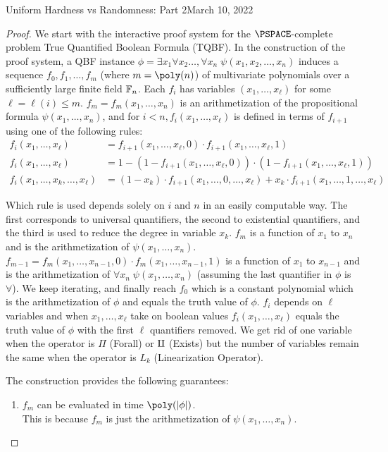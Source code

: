 \begin{lecture}{8}{Uniform Hardness vs Randomness: Part 2}{March 10, 2022}
\begin{proof}
We start with the interactive proof system for the $\PSPACE$-complete problem True Quantified Boolean Formula (TQBF). In the construction of the proof system, a QBF instance 
$\phi = \exists x_1 \forall x_2 \ldots , \forall x_n \; \psi(x_1,x_2, \ldots, x_n)$ induces a sequence $f_0, f_1, \ldots , f_m$ (where $m = \poly(n)$) of multivariate polynomials over a sufficiently large finite field $\mathbb{F}_n$. 
Each $f_i$ has variables $(x_1, \dots, x_{\ell})$ for some $\ell = \ell(i) \leq m$. 
$f_m = f_m(x_1, \ldots , x_n)$ is an arithmetization of the propositional formula $\psi(x_1, \ldots , x_n)$, and for $i < n, f_i( x_1, \ldots , x_{\ell})$ is defined in terms of $f_{i+1}$ using one of the following rules:
\begin{align*}
	f_i(x_1, \ldots, x_{\ell}) &= f_{i+1}(x_1, \ldots, x_{\ell},0) \cdot f_{i+1}(x_1, \ldots, x_{\ell},1) \tag{Forall} \\
	f_i(x_1, \ldots, x_{\ell}) &= 1- ( 1- f_{i+1}(x_1, \ldots, x_{\ell},0) ) \cdot ( 1- f_{i+1}(x_1, \ldots, x_{\ell},1) ) \tag{Exists}	\\
	f_i(x_1, \ldots, x_k, \ldots, x_{\ell}) &= (1-x_k) \cdot f_{i+1}(x_1, \ldots, 0, \ldots, x_{\ell}) + x_k \cdot f_{i+1}(x_1, \ldots, 1, \ldots, x_{\ell}) \tag{Linearization}
\end{align*}

Which rule is used depends solely on $i$ and $n$ in an easily computable way. The first corresponds to universal quantifiers, the second to existential quantifiers, and the third is used to reduce the degree in variable $x_k$.
$f_m$ is a function of $x_1$ to $x_n$ and is the arithmetization of $\psi(x_1, \ldots , x_n)$. $f_{m-1}=f_{m}(x_1, \ldots, x_{n-1},0) \cdot f_{m}(x_1, \ldots, x_{n-1},1)$ is a function of $x_1$ to $x_{n-1}$ and is the arithmetization of $\forall x_n \; \psi(x_1, \ldots , x_n)$ (assuming the last quantifier in $\phi$ is $\forall$). We keep iterating, and finally reach $f_0$ which is a constant polynomial which is the arithmetization of $\phi$ and equals the truth value of $\phi$. $f_i$ depends on $\ell$ variables and when $x_1, \ldots , x_{\ell}$ take on boolean values $f_i(x_1, \ldots , x_{\ell})$ equals the truth value of $\phi$ with the first $\ell$ quantifiers removed.
We get rid of one variable when the operator is $\Pi$ (Forall) or $\antipi$ (Exists) but the number of variables remain the same when the operator is $L_k$ (Linearization Operator).

The construction provides the following guarantees:
\begin{enumerate}
	\item $f_m$ can be evaluated in time $\poly(\card{\phi})$. \\
	This is because $f_m$ is just the arithmetization of $\psi(x_1, \ldots , x_n)$.
	

\end{enumerate}
\end{proof}
\end{lecture}
